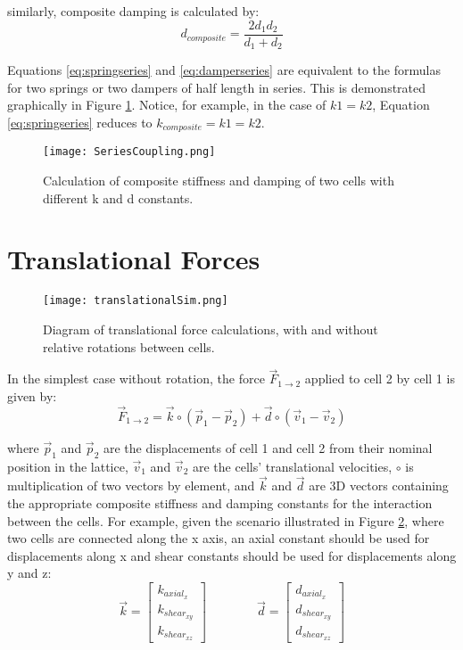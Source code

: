 {similarly, composite damping is calculated by:
 \begin{equation} \label{eq:damperseries}
d_{composite} = \dfrac{2d_1d_2}{d_1+d_2}
 \end{equation}
 
 Equations \ref{eq:springseries} and \ref{eq:damperseries} are equivalent to the formulas for two springs or two dampers of half length in series.  This is demonstrated graphically in Figure \ref{fig:SeriesCoupling}.  Notice, for example, in the case of $k1=k2$, Equation \ref{eq:springseries} reduces to $ k_{composite} = k1 = k2$.\\
 
 \begin{figure}
  \texttt{[image: SeriesCoupling.png]}
  \caption{Calculation of composite stiffness and damping of two cells with different k and d constants.}
  \label{fig:SeriesCoupling}
\end{figure}


\section{Translational Forces}

\begin{figure}
  \texttt{[image: translationalSim.png]}
  \caption{Diagram of translational force calculations, with and without relative rotations between cells.}
  \label{fig:translationalSim}
\end{figure}

In the simplest case without rotation, the force $\vec{F}_{1 \rightarrow 2}$ applied to cell 2 by cell 1 is given by:
\begin{equation} \label{eq:translationalForce}
\vec{F}_{1\rightarrow2} = \vec{k} \circ (\vec{p}_1 - \vec{p}_2) + \vec{d} \circ (\vec{v}_1 - \vec{v}_2)
\end{equation}

where $\vec{p}_1$ and $\vec{p}_2$ are the displacements of cell 1 and cell 2 from their nominal position in the lattice, $\vec{v}_1$ and $\vec{v}_2$ are the cells' translational velocities, $\circ$ is multiplication of two vectors by element, and $\vec{k}$ and $\vec{d}$ are 3D vectors containing the appropriate composite stiffness and damping constants for the interaction between the cells.  For example, given the scenario illustrated in Figure \ref{fig:translationalSim}, where two cells are connected along the x axis, an axial constant should be used for displacements along x and shear constants should be used for displacements along y and z:
\[ \vec{k} =  \left[ \begin{array}{ccc}
k_{axial_x}\\
k_{shear_{xy}}\\
k_{shear_{xz}}
 \end{array} \right]  
  \qquad\qquad
  \vec{d} =  \left[ \begin{array}{ccc}
d_{axial_x}\\
d_{shear_{xy}}\\
d_{shear_{xz}}
 \end{array} \right] \] 
 
}
